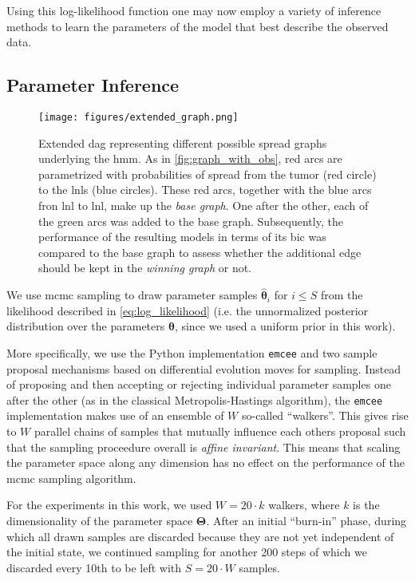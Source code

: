\documentclass[twocolumn]{article}
\begin{document}
Using this log-likelihood function one may now employ a variety of inference methods to learn the parameters of the model that best describe the observed data.


\subsection{Parameter Inference}
\label{subsec:formalism:inference}

\begin{figure}[!b]
    \centering
    \texttt{[image: figures/extended\_graph.png]}
    \caption{Extended \gls{dag} representing different possible spread graphs underlying the \gls{hmm}. As in \cref{fig:graph_with_obs}, red arcs are parametrized with probabilities of spread from the tumor (red circle) to the \glspl{lnl} (blue circles). These red arcs, together with the blue arcs fron \gls{lnl} to \gls{lnl}, make up the \emph{base graph}. One after the other, each of the green arcs was added to the base graph. Subsequently, the performance of the resulting models in terms of its \gls{bic} was compared to the base graph to assess whether the additional edge should be kept in the \emph{winning graph} or not. \label{fig:extended_graph}}
\end{figure}

We use \gls{mcmc} sampling to draw parameter samples $\boldsymbol{\hat{\theta}}_i$ for $i \leq S$ from the likelihood described in \cref{eq:log_likelihood} (i.e. the unnormalized posterior distribution over the parameters $\boldsymbol{\theta}$, since we used a uniform prior in this work).

More specifically, we use the Python implementation \texttt{emcee} \cite{foreman-mackey_emcee_2013} and two sample proposal mechanisms based on differential evolution moves \cite{ter_braak_differential_2008,nelson_run_2013} for sampling. Instead of proposing and then accepting or rejecting individual parameter samples one after the other (as in the classical Metropolis-Hastings algorithm), the \texttt{emcee} implementation makes use of an ensemble of $W$ so-called ``walkers''. This gives rise to $W$ parallel chains of samples that mutually influence each others proposal such that the sampling proceedure overall is \emph{affine invariant}. This means that scaling the parameter space along any dimension has no effect on the performance of the \gls{mcmc} sampling algorithm.

For the experiments in this work, we used $W = 20 \cdot k$ walkers, where $k$ is the dimensionality of the parameter space $\boldsymbol{\Theta}$. After an initial ``burn-in'' phase, during which all drawn samples are discarded because they are not yet independent of the initial state, we continued sampling for another 200 steps of which we discarded every 10th to be left with $S = 20 \cdot W$ samples.
\end{document}
